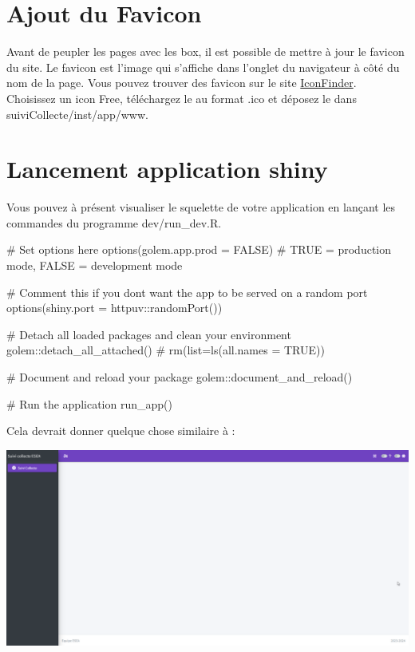 \documentclass[
  letterpaper,
  DIV=11,
  numbers=noendperiod]{scrreprt}
\newenvironment{Shaded}{\begin{snugshade}}{\end{snugshade}}
\newcommand{\AttributeTok}[1]{\textcolor[rgb]{0.40,0.45,0.13}{#1}}
\newcommand{\CommentTok}[1]{\textcolor[rgb]{0.37,0.37,0.37}{#1}}
\newcommand{\ConstantTok}[1]{\textcolor[rgb]{0.56,0.35,0.01}{#1}}
\newcommand{\FunctionTok}[1]{\textcolor[rgb]{0.28,0.35,0.67}{#1}}
\newcommand{\NormalTok}[1]{\textcolor[rgb]{0.00,0.23,0.31}{#1}}
\newcommand{\SpecialCharTok}[1]{\textcolor[rgb]{0.37,0.37,0.37}{#1}}
\begin{document}
\hypertarget{ajout-du-favicon}{%
\section{Ajout du Favicon}\label{ajout-du-favicon}}

Avant de peupler les pages avec les box, il est possible de mettre à
jour le favicon du site. Le favicon est l'image qui s'affiche dans
l'onglet du navigateur à côté du nom de la page. Vous pouvez trouver des
favicon sur le site \href{https://www.iconfinder.com/}{IconFinder}.
Choisissez un icon Free, téléchargez le au format .ico et déposez le
dans suiviCollecte/inst/app/www.

\hypertarget{lancement-application-shiny}{%
\section{Lancement application
shiny}\label{lancement-application-shiny}}

Vous pouvez à présent visualiser le squelette de votre application en
lançant les commandes du programme dev/run\_dev.R.

\begin{Shaded}
\begin{Highlighting}[]
\CommentTok{\# Set options here}
\FunctionTok{options}\NormalTok{(}\AttributeTok{golem.app.prod =} \ConstantTok{FALSE}\NormalTok{) }\CommentTok{\# TRUE = production mode, FALSE = development mode}

\CommentTok{\# Comment this if you don\textquotesingle{}t want the app to be served on a random port}
\FunctionTok{options}\NormalTok{(}\AttributeTok{shiny.port =}\NormalTok{ httpuv}\SpecialCharTok{::}\FunctionTok{randomPort}\NormalTok{())}

\CommentTok{\# Detach all loaded packages and clean your environment}
\NormalTok{golem}\SpecialCharTok{::}\FunctionTok{detach\_all\_attached}\NormalTok{()}
\CommentTok{\# rm(list=ls(all.names = TRUE))}

\CommentTok{\# Document and reload your package}
\NormalTok{golem}\SpecialCharTok{::}\FunctionTok{document\_and\_reload}\NormalTok{()}

\CommentTok{\# Run the application}
\FunctionTok{run\_app}\NormalTok{()}
\end{Highlighting}
\end{Shaded}

Cela devrait donner quelque chose similaire à :

\includegraphics{./images/esea_squelette_vide.png}
\end{document}
